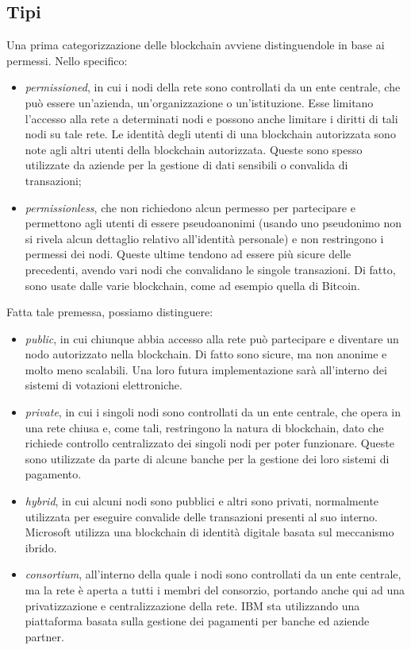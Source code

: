 \subsection{Tipi}\label{sec:tecnologie-blockchain-tipi}
Una prima categorizzazione delle blockchain avviene distinguendole in base ai permessi. Nello specifico:
\begin{itemize}
    \item \textit{permissioned}, in cui i nodi della rete sono controllati da un ente centrale, che può essere un'azienda, un'organizzazione o un'istituzione.
    Esse limitano l'accesso alla rete a determinati nodi e possono anche limitare i diritti di tali nodi su tale rete. Le identità degli utenti di una blockchain autorizzata sono note agli altri utenti della blockchain autorizzata.
    Queste sono spesso utilizzate da aziende per la gestione di dati sensibili o convalida di transazioni;
    \item \textit{permissionless}, che non richiedono alcun permesso per partecipare e permettono agli utenti di essere pseudoanonimi 
    (usando uno pseudonimo non si rivela alcun dettaglio relativo all'identità personale) e non restringono i permessi dei nodi. Queste ultime tendono ad essere più sicure delle precedenti, avendo vari nodi che convalidano le singole transazioni.
    Di fatto, sono usate dalle varie blockchain, come ad esempio quella di Bitcoin.
\end{itemize}

Fatta tale premessa, possiamo distinguere:
\begin{itemize}
    \item \textit{public}, in cui chiunque abbia accesso alla rete può partecipare e diventare un nodo autorizzato nella blockchain. Di fatto sono sicure, ma non anonime e molto meno scalabili.
    Una loro futura implementazione sarà all'interno dei sistemi di votazioni elettroniche.
    \item \textit{private}, in cui i singoli nodi sono controllati da un ente centrale, che opera in una rete chiusa e, come tali, restringono la natura di blockchain, dato che richiede controllo centralizzato dei singoli nodi per poter funzionare.
    Queste sono utilizzate da parte di alcune banche per la gestione dei loro sistemi di pagamento.
    \item \textit{hybrid}, in cui alcuni nodi sono pubblici e altri sono privati, normalmente utilizzata per eseguire convalide delle transazioni presenti al suo interno.
    Microsoft utilizza una blockchain di identità digitale basata sul meccanismo ibrido.
    \item \textit{consortium}, all'interno della quale i nodi sono controllati da un ente centrale, ma la rete è aperta a tutti i membri del consorzio, portando anche qui ad una privatizzazione e centralizzazione della rete.
    IBM sta utilizzando una piattaforma basata sulla gestione dei pagamenti per banche ed aziende partner.
\end{itemize}

